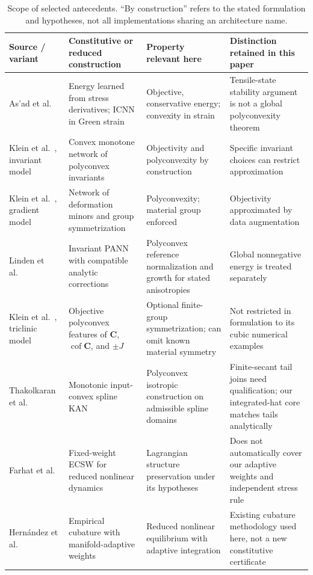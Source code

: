 \documentclass[10pt,a4paper]{article}
\newcommand{\C}{\bm C}
\newcommand{\cof}{\operatorname{cof}}
\begin{document}
\begin{table}[htbp]
\centering\footnotesize
\caption{Scope of selected antecedents. ``By construction'' refers to the stated formulation and hypotheses, not all implementations sharing an architecture name.}
\label{tab:literature}
\begin{tabularx}{\linewidth}{>{\raggedright\arraybackslash}p{2.2cm}YYY}
\toprule
Source / variant & Constitutive or reduced construction & Property relevant here & Distinction retained in this paper\\
\midrule
As'ad et al.~\cite{asad2022} & Energy learned from stress derivatives; ICNN in Green strain & Objective, conservative energy; convexity in strain & Tensile-state stability argument is not a global polyconvexity theorem\\
Klein et al.~\cite{klein2022}, invariant model & Convex monotone network of polyconvex invariants & Objectivity and polyconvexity by construction & Specific invariant choices can restrict approximation\\
Klein et al.~\cite{klein2022}, gradient model & Network of deformation minors and group symmetrization & Polyconvexity; material group enforced & Objectivity approximated by data augmentation\\
Linden et al.~\cite{linden2023} & Invariant PANN with compatible analytic corrections & Polyconvex reference normalization and growth for stated anisotropies & Global nonnegative energy is treated separately\\
Klein et al.~\cite{klein2026}, triclinic model & Objective polyconvex features of $\C$, $\cof\C$, and $\pm J$ & Optional finite-group symmetrization; can omit known material symmetry & Not restricted in formulation to its cubic numerical examples\\
Thakolkaran et al.~\cite{thakolkaran2025} & Monotonic input-convex spline KAN & Polyconvex isotropic construction on admissible spline domains & Finite-secant tail joins need qualification; our integrated-hat core matches tails analytically\\
Farhat et al.~\cite{farhat2015} & Fixed-weight ECSW for reduced nonlinear dynamics & Lagrangian structure preservation under its hypotheses & Does not automatically cover our adaptive weights and independent stress rule\\
Hern\'andez et al.~\cite{hernandez2026} & Empirical cubature with manifold-adaptive weights & Reduced nonlinear equilibrium with adaptive integration & Existing cubature methodology used here, not a new constitutive certificate\\
\bottomrule
\end{tabularx}
\end{table}
\end{document}
